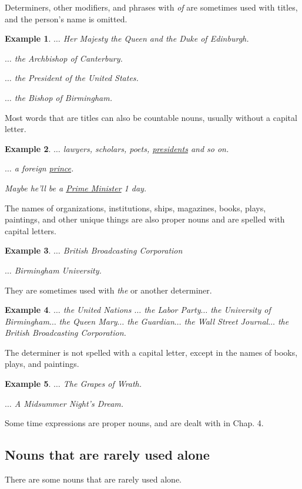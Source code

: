 \documentclass[oneside]{book}
\numberwithin{equation}{section}
\newtheorem{example}{Example}[section]
\begin{document}
%
\noindent{} Determiners, other modifiers, and phrases with \textit{of} are sometimes used with titles, and the person's name is omitted.
\begin{example}
    $\ldots$ Her Majesty the Queen and the Duke of Edinburgh.

    $\ldots$ the Archbishop of Canterbury.
    
    $\ldots$ the President of the United States.
    
    $\ldots$ the Bishop of Birmingham.
\end{example}
%
\noindent{} Most words that are titles can also be countable nouns, usually without a capital letter.
\begin{example}
    $\ldots$ lawyers, scholars, poets, \underline{presidents} and so on.
    
    $\ldots$ a foreign \underline{prince}.
    
    Maybe he'll be a \underline{Prime Minister} 1 day.
\end{example}
%
\noindent{} The names of organizations, institutions, ships, magazines, books, plays, paintings, and other unique things are also proper nouns and are spelled with capital letters.
\begin{example}
    $\ldots$ British Broadcasting Corporation
    
    $\ldots$ Birmingham University.
\end{example}
They are sometimes used with \textit{the} or another determiner.
\begin{example}
    $\ldots$ the United Nations $\ldots$ the Labor Party$\ldots$ the University of Birmingham$\ldots$ the Queen Mary$\ldots$ the Guardian$\ldots$ the Wall Street Journal$\ldots$ the British Broadcasting Corporation.
\end{example}
The determiner is not spelled with a capital letter, except in the names of books, plays, and paintings.
\begin{example}
    $\ldots$ The Grapes of Wrath.
    
    $\ldots$ A Midsummer Night's Dream.
\end{example}
Some time expressions are proper nouns, and are dealt with in Chap. 4.

\subsection{Nouns that are rarely used alone}
\noindent{} There are some nouns that are rarely used alone.
\end{document}
